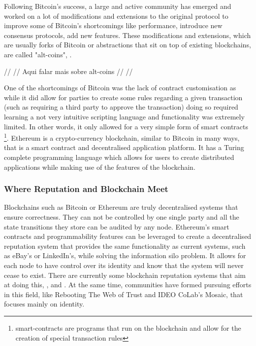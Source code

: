 \documentclass[llncsdoc]{llncs}
\begin{document}
Following Bitcoin's success, a large and active community has emerged and worked on a lot of modifications and extensions to the original protocol to improve some of Bitcoin's shortcomings like performance, introduce new consensus protocols, add new features. These modifications and extensions, which are usually forks of Bitcoin or abstractions that sit on top of existing blockchains, are called "alt-coins", \cite{Bonneau:2015ema}.

// // Aqui falar mais sobre alt-coins // //

One of the shortcomings of Bitcoin was the lack of contract customisation as while it did allow for parties to create some rules regarding a given transaction (such as requiring a third party to approve the transaction) doing so required learning a not very intuitive scripting language and functionality was extremely limited. In other words, it only allowed for a very simple form of smart contracts \footnote{smart-contracts are programs that run on the blockchain and allow for the creation of special transaction rules}. Ethereum is a crypto-currency blockchain, similar to Bitcoin in many ways, that is a smart contract and decentralised application platform. It has a Turing complete programming language which allows for users to create distributed applications while making use of the features of the blockchain.

\subsubsection{Where Reputation and Blockchain Meet}
Blockchains such as Bitcoin or Ethereum are truly decentralised systems that ensure correctness. They can not be controlled by one single party and all the state transitions they store can be audited by any node. Ethereum's smart contracts and programmability features can be leveraged to create a decentralised reputation system that provides the same functionality as current systems, such as eBay's or LinkedIn's, while solving the information silo problem. It allows for each node to have control over its identity and know that the system will never cease to exist. There are currently some blockchain reputation systems that aim at doing this, \cite{Dennis:2016um}, \cite{Yasin:2016ja} and \cite{Buechler:2015tv}. At the same time, communities have formed pursuing efforts in this field, like Rebooting The Web of Trust and IDEO CoLab's Mosaic, that focuses mainly on identity.
\end{document}
